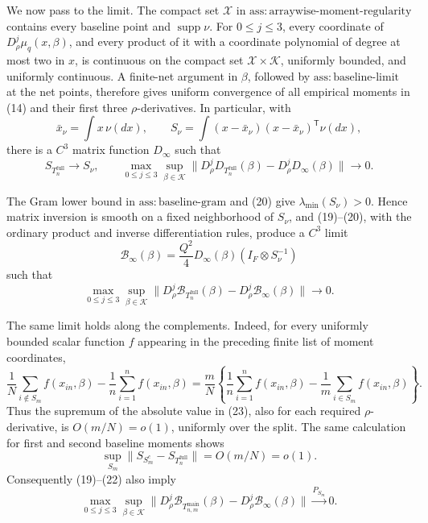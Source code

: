 We now pass to the limit.  The compact set \(\mathcal X\) in
\(\mathrm{ass{:}arraywise\text{-}moment\text{-}regularity}\) contains every baseline point and \(\operatorname{supp}\nu\).  For \(0\leq j\leq3\), every coordinate of
\(D_\rho^j\mu_q(x,\beta)\), and every product of it with a coordinate polynomial of degree at most two in \(x\), is continuous on the compact set
\(\mathcal X\times\mathcal K\), uniformly bounded, and uniformly continuous.  A finite-net argument in \(\beta\), followed by
\(\mathrm{ass{:}baseline\text{-}limit}\) at the net points, therefore gives uniform convergence of all empirical moments in (14) and their first three \(\rho\)-derivatives.  In particular, with
\[
\bar x_\nu=\int x\,\nu(dx),
\qquad
S_\nu=\int(x-\bar x_\nu)(x-\bar x_\nu)^{\mathsf T}\nu(dx),
\]
there is a \(C^3\) matrix function \(D_\infty\) such that
\[
S_{T_n^{\mathrm{full}}}\to S_\nu,
\qquad
\max_{0\leq j\leq3}\sup_{\beta\in\mathcal K}
\|D_\rho^jD_{T_n^{\mathrm{full}}}(\beta)
-D_\rho^jD_\infty(\beta)\|\to0.
\tag{20}
\]

The Gram lower bound in \(\mathrm{ass{:}baseline\text{-}gram}\) and (20) give
\(\lambda_{\min}(S_\nu)>0\).  Hence matrix inversion is smooth on a fixed neighborhood of \(S_\nu\), and (19)--(20), with the ordinary product and inverse differentiation rules, produce a \(C^3\) limit
\[
\mathcal B_\infty(\beta)
=\frac{Q^2}{4}D_\infty(\beta)(I_F\otimes S_\nu^{-1})
\tag{21}
\]
such that
\[
\max_{0\leq j\leq3}\sup_{\beta\in\mathcal K}
\|D_\rho^j\mathcal B_{T_n^{\mathrm{full}}}(\beta)
-D_\rho^j\mathcal B_\infty(\beta)\|\to0.
\tag{22}
\]

The same limit holds along the complements.  Indeed, for every uniformly bounded scalar function \(f\) appearing in the preceding finite list of moment coordinates,
\[
\frac1N\sum_{i\notin S_m}f(x_{in},\beta)
-\frac1n\sum_{i=1}^nf(x_{in},\beta)
=\frac mN\left\{
\frac1n\sum_{i=1}^nf(x_{in},\beta)
-\frac1m\sum_{i\in S_m}f(x_{in},\beta)
\right\}.
\tag{23}
\]
Thus the supremum of the absolute value in (23), also for each required \(\rho\)-derivative, is \(O(m/N)=o(1)\), uniformly over the split.  The same calculation for first and second baseline moments shows
\[
\sup_{S_m}\|S_{S_m^c}-S_{T_n^{\mathrm{full}}}\|=O(m/N)=o(1).
\tag{24}
\]
Consequently (19)--(22) also imply
\[
\max_{0\leq j\leq3}\sup_{\beta\in\mathcal K}
\|D_\rho^j\mathcal B_{T_{n,m}^{\mathrm{main}}}(\beta)
-D_\rho^j\mathcal B_\infty(\beta)\|
\xrightarrow{P_{S_m}}0.
\tag{25}
\]

